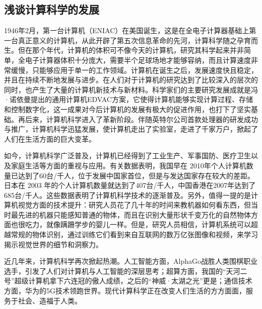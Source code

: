 \documentclass{article}
\begin{document}
\subsection{浅谈计算科学的发展}
1946年2月，第一台计算机（ENIAC）在美国诞生，这是在全电子计算器基础上第一台真正意义的计算机，从此开辟了第五次信息革命的先河，计算科学随之孕育而生。但在那个年代，计算机的体积可不像今天的计算机，研究其科学起来并非简单，全电子计算器体积十分庞大，需要半个足球场地才能够容纳，而且计算速度非常缓慢，只能够应用于单一的工作领域\citep{yingran}。计算机在诞生之后，发展速度快且稳定，并且在持续不断地发展与进步。在人们对于计算机的研究达到了比较深入的层次的同时，也产生了大量的计算机新技术与新材料。科学家们的主要研究发展成就是冯·诺依曼提出的通用计算机EDVAC方案，它使得计算机能够实现计算过程、存储和控制数字化，这一成果对今后计算机的发展有极大的促进作用，也打下了坚实基础。再后来，计算机科学进入了革新阶段。伴随英特尔公司首款处理器的研发成功与推广，计算机科学迅猛发展，使计算机走出了实验室，走进了千家万户，掀起了人们在生活方面的巨大变革\citep{shenhaoran}。\par
如今，计算机科学广泛普及，计算机已经得到了工业生产、军事国防、医疗卫生以及家庭生活等方面的重视与应用。有关数据表明，我国早在 2010年个人计算机数量已达到了60台/千人，位于发展中国家首位，但是与发达国家存在较大的差距。日本在 2003 年的个人计算机数量就达到了407台/千人，中国香港在2007年达到了685台/千人\citep{yingran}。这些数据表明了计算机科学技术的逐渐普及。另外，值得一提的是计算机视觉方面的技术提升：研究人员花了几十年的时间来教机器如何看东西，但当时最先进的机器只能感知普通的物体，而且在识别大量形状千变万化的自然物体方面也很吃力，就像蹒跚学步的婴儿一样。但是，研究人员相信，计算机系统可以超越常规的物体识别，通过训练它们看到来自互联网的数万亿张图像和视频，来学习揭示视觉世界的细节和洞察力\citep{xinfeng}。\par
近几年来，计算机科学再次掀起热潮。人工智能方面，AlphaGo战胜人类围棋职业选手，引发了人们对计算机与人工智能的深层思考；超算方面，我国的“天河二号”超级计算机拿下六连冠的傲人成绩，之后的“神威·太湖之光”更是；通信技术方面，华为的5G技术领跑世界。现代计算科学正在改变人们生活的方方面面，服务于社会、造福于人类。\par
\end{document}
